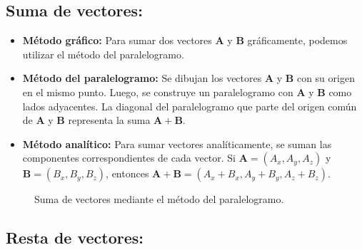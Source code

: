 \documentclass{book}
\begin{document}
\subsection{Suma de vectores:}

\begin{itemize}
    \item \textbf{Método gráfico:} Para sumar dos vectores $\mathbf{A}$ y $\mathbf{B}$ gráficamente, podemos utilizar el método del paralelogramo.
    \item \textbf{Método del paralelogramo:} Se dibujan los vectores $\mathbf{A}$ y $\mathbf{B}$ con su origen en el mismo punto. Luego, se construye un paralelogramo con $\mathbf{A}$ y $\mathbf{B}$ como lados adyacentes. La diagonal del paralelogramo que parte del origen común de $\mathbf{A}$ y $\mathbf{B}$ representa la suma $\mathbf{A} + \mathbf{B}$.
    \item \textbf{Método analítico:} Para sumar vectores analíticamente, se suman las componentes correspondientes de cada vector. Si $\mathbf{A} = (A_x, A_y, A_z)$ y $\mathbf{B} = (B_x, B_y, B_z)$, entonces $\mathbf{A} + \mathbf{B} = (A_x + B_x, A_y + B_y, A_z + B_z)$.
\end{itemize}

\begin{figure}[h!]
    \centering
    \caption{Suma de vectores mediante el método del paralelogramo.}
    \label{fig:paralelogramo}
\end{figure}

\subsection{Resta de vectores:}
\end{document}
